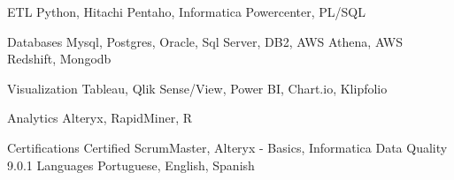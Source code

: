 

\begin{cvskills}

  \cvskill
    {ETL} %
    {Python, Hitachi Pentaho, Informatica Powercenter, PL/SQL} %

  \cvskill
    {Databases} %
    {Mysql, Postgres, Oracle, Sql Server, DB2, AWS Athena, AWS Redshift, Mongodb} %

  \cvskill
    {Visualization} %
    {Tableau, Qlik Sense/View, Power BI, Chart.io, Klipfolio} %

  \cvskill
    {Analytics} %
    {Alteryx, RapidMiner, R} %

  \cvskill
    {Certifications} %
    {Certified ScrumMaster\textregistered, Alteryx - Basics, Informatica Data Quality 9.0.1} %
  \cvskill
    {Languages} %
    {Portuguese, English, Spanish} %

\end{cvskills}
